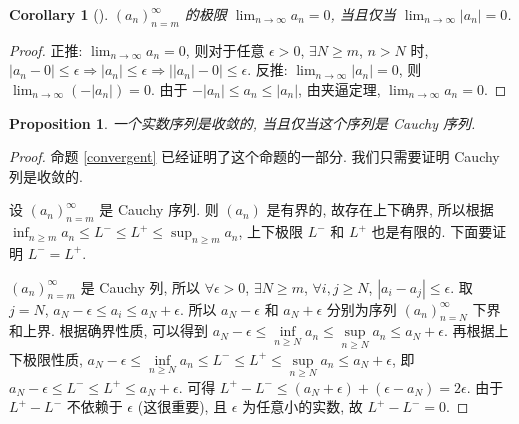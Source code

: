 \documentclass[UTF8]{ctexart}
\theoremstyle{mystyle}
\newtheorem{proposition}{Proposition}[section]
\theoremstyle{myremark}
\theoremstyle{plain}
\newtheorem{corollary}{Corollary}[section]
\begin{document}
\begin{corollary}[]
    $ (a_n)_{n = m}^\infty $ 的极限 $\displaystyle \lim_{n \to \infty} a_n = 0 $, 当且仅当 $\displaystyle \lim_{n \to \infty} |a_n| = 0 $.
\end{corollary}

\begin{proof}
    正推: $\displaystyle \lim_{n \to \infty} a_n = 0 $, 则对于任意 $ \epsilon > 0 $, $ \exists N \geqslant m $, $ n > N $ 时, $ |a_n - 0| \leqslant \epsilon \Longrightarrow |a_n| \leqslant \epsilon \Longrightarrow \big| |a_n| - 0 \big| \leqslant \epsilon $. 反推: $\displaystyle \lim_{n \to \infty} |a_n| = 0 $, 则 $\displaystyle \lim_{n \to \infty} (-|a_n|) = 0 $. 由于 $ -|a_n| \leqslant a_n \leqslant |a_n| $, 由夹逼定理, $\displaystyle \lim_{n \to \infty} a_n = 0 $.
\end{proof}

\begin{proposition}
    一个实数序列是收敛的, 当且仅当这个序列是 Cauchy 序列.
\end{proposition}

\begin{proof}
    命题 \ref{convergent} 已经证明了这个命题的一部分. 我们只需要证明 Cauchy 列是收敛的.

    设 $ (a_n)_{n = m}^\infty $ 是 Cauchy 序列. 则 $ (a_n) $ 是有界的, 故存在上下确界, 所以根据 $\displaystyle \inf_{n \geqslant m} a_n \leqslant L^- \leqslant L^+ \leqslant \sup_{n \geqslant m} a_n $, 上下极限 $ L^- $ 和 $ L^+ $ 也是有限的. 下面要证明 $ L^- = L^+ $.

    $ (a_n)_{n = m}^\infty $ 是 Cauchy 列, 所以 $ \forall \epsilon > 0 $, $ \exists N \geqslant m $, $ \forall i, j \geqslant N $, $ |a_i - a_j| \leqslant \epsilon $. 取 $ j = N $, $ a_N - \epsilon \leqslant a_i \leqslant a_N + \epsilon $. 所以 $ a_N - \epsilon $ 和 $ a_N + \epsilon $ 分别为序列 $ (a_n)_{n = N}^\infty $ 下界和上界. 根据确界性质, 可以得到 $ a_N - \epsilon \leqslant \inf\limits_{n \geqslant N} a_n \leqslant \sup\limits_{n \geqslant N} a_n \leqslant a_N + \epsilon $. 再根据上下极限性质, $ a_N - \epsilon \leqslant \inf\limits_{n \geqslant N} a_n \leqslant L^- \leqslant L^+ \leqslant \sup\limits_{n \geqslant N} a_n \leqslant a_N + \epsilon $, 即 $ a_N - \epsilon \leqslant  L^- \leqslant L^+ \leqslant a_N + \epsilon $. 可得 $ L^+ - L^- \leqslant (a_N + \epsilon) + (\epsilon - a_N) = 2 \epsilon $. 由于 $ L^+ - L^- $ 不依赖于 $ \epsilon $ (这很重要), 且 $ \epsilon $ 为任意小的实数, 故 $ L^+ - L^- = 0 $.
\end{proof}
\end{document}
